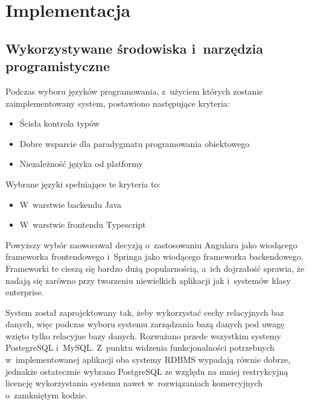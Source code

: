 \chapter{Implementacja}\label{ch:implementation}
\section{Wykorzystywane środowiska i~narzędzia programistyczne}\label{sec:dev-tools}
Podczas wyboru języków programowania, z~użyciem których zostanie zaimplementowany system, postawiono następujące kryteria:

\begin{itemize}
    \item Ścisła kontrola typów
    \item Dobre wsparcie dla paradygmatu programowania obiektowego
    \item Niezależność języka od platformy
\end{itemize}

Wybrane języki spełniające te kryteria to:

\begin{itemize}
    \item W~warstwie backendu Java\cite{tech:java}
    \item W~warstwie frontendu Typescript\cite{tech:typescript}
\end{itemize}

Powyższy wybór zaowocował decyzją o~zastosowaniu Angulara\cite{tech:angular} jako wiodącego frameworka frontendowego i~Springa\cite{tech:spring} jako wiodącego frameworka backendowego.
Frameworki te cieszą się bardzo dużą popularnością, a~ich dojrzałość sprawia, że nadają się zarówno przy tworzeniu niewielkich aplikacji jak i~systemów klasy enterprise.

\par
{}

\par
System został zaprojektowany tak, żeby wykorzystać cechy relacyjnych baz danych, więc podczas wyboru systemu zarządzania bazą danych pod uwagę wzięto tylko relacyjne bazy danych.
Rozważano przede wszystkim systemy PostegreSQL\cite{tech:postgresql} i~MySQL\cite{tech:mysql}. Z~punktu widzenia funkcjonalności potrzebnych w~implementowanej aplikacji oba systemy RDBMS wypadają równie dobrze, jednakże ostatecznie wybrano PostgreSQL ze względu na mniej restrykcyjną licencję wykorzystania systemu nawet w~rozwiązaniach komercyjnych o~zamkniętym kodzie.
\par
{}

